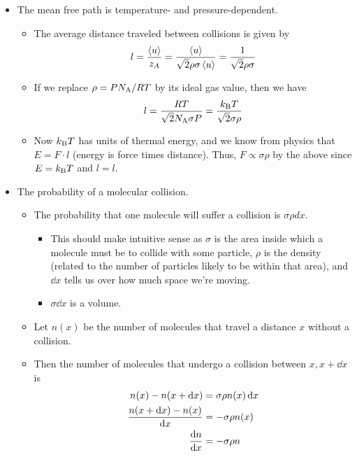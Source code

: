 \documentclass[../notes.tex]{subfiles}
\begin{document}
\begin{itemize}
\begin{itemize}
\begin{equation*}
        \end{equation*}
    \end{itemize}
    \item The mean free path is temperature- and pressure-dependent.
    \begin{itemize}
        \item The average distance traveled between collisions is given by
        \begin{equation*}
            l = \frac{\left\langle{u}\right\rangle}{z_A}
            = \frac{\left\langle{u}\right\rangle}{\sqrt{2}\rho\sigma\left\langle{u}\right\rangle}
            = \frac{1}{\sqrt{2}\rho\sigma}
        \end{equation*}
        \item If we replace $\rho=PN_\text{A}/RT$ by its ideal gas value, then we have
        \begin{equation*}
            l = \frac{RT}{\sqrt{2}N_\text{A}\sigma P}
            = \frac{k_\text{B} T}{\sqrt{2}\sigma\rho}
        \end{equation*}
        \item Now $k_\text{B} T$ has units of thermal energy, and we know from physics that $E=F\cdot l$ (energy is force times distance). Thus, $F\propto\sigma\rho$ by the above since $E=k_\text{B} T$ and $l=l$.
    \end{itemize}
    \item The probability of a molecular collision.
    \begin{itemize}
        \item The probability that one molecule will suffer a collision is $\sigma\rho dx$.
        \begin{itemize}
            \item This should make intuitive sense as $\sigma$ is the area inside which a molecule must be to collide with some particle, $\rho$ is the density (related to the number of particles likely to be within that area), and $\dd{x}$ tells us over how much space we're moving.
            \item $\sigma\dd{x}$ is a volume.
        \end{itemize}
        \item Let $n(x)$ be the number of molecules that travel a distance $x$ without a collision.
        \item Then the number of molecules that undergo a collision between $x,x+\dd{x}$ is
        \begin{align*}
            n(x)-n(x+\dd{x}) &= \sigma\rho n(x)\dd{x}\\
            \frac{n(x+\dd{x})-n(x)}{\dd{x}} &= -\sigma\rho n(x)\\
            \dv{n}{x} &= -\sigma\rho n
        \end{align*}
    \end{itemize}
\end{itemize}
\end{document}
